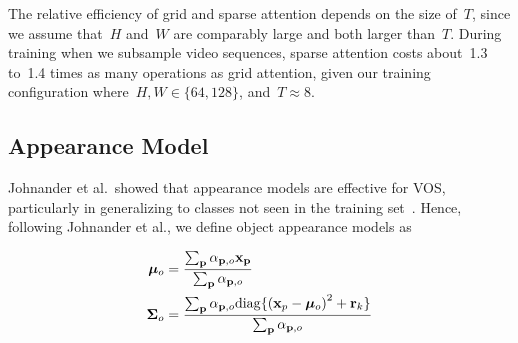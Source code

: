 The relative efficiency of grid and sparse attention depends on the size
of~$T$, since we assume that~$H$ and~$W$ are comparably large and both larger
than~$T$.
During training when we subsample video sequences, sparse attention costs
about~\num{1.3} to~\num{1.4} times as many operations as grid attention, given
our training configuration where~$H, W \in \{64, 128\}$, and~$T\approx 8$.


\subsection{Appearance Model}


Johnander et al.\ showed that appearance models are effective for VOS,
particularly in generalizing to classes not seen in the training
set~\cite{johnander2019agenerative}.  Hence, following Johnander et al., we
define object appearance models as

\begin{subequations}
\begin{align}
        \bm{\mu}_o{} &= \frac{\sum_{\mathbf{p}}{}\alpha_{\mathbf{p}{}, o} \mathbf{x}_{\mathbf{p}}{}}{\sum_{\mathbf{p}}{}\alpha_{\mathbf{p}{}, o}} \\
        \bm{\Sigma}_o{} &= \frac{\sum_{\mathbf{p}}{}\alpha_{\mathbf{p}{}, o} \mathrm{diag}\{{(\mathbf{x}_p - \bm{\mu}_o{})}^2 + \mathbf{r}_k\}}{\sum_{\mathbf{p}}{}\alpha_{\mathbf{p}{}, o}}
\end{align}
\label{eqn:appearancemodel}
\end{subequations}

